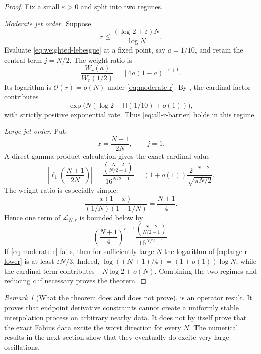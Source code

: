 \documentclass[11pt,oneside]{article}
\theoremstyle{definition}
\theoremstyle{remark}
\newtheorem{remark}[theorem]{Remark}
\newcommand{\bigO}{\mathcal O}
\newcommand{\abs}[1]{\left\lvert #1\right\rvert}
\begin{document}
\begin{proof}
Fix a small $\varepsilon>0$ and split into two regimes.

\emph{Moderate jet order.}  Suppose
\begin{equation}
 r\le \frac{(\log2+\varepsilon)N}{\log N}.
 \label{eq:moderate-r}
\end{equation}
Evaluate \eqref{eq:weighted-lebesgue} at a fixed point, say $a=1/10$, and retain the central term $j=N/2$.  The weight ratio is
\begin{equation}
 \frac{W_r(a)}{W_r(1/2)}=[4a(1-a)]^{r+1}.
\end{equation}
Its logarithm is $\bigO(r)=o(N)$ under \eqref{eq:moderate-r}.  By , the cardinal factor contributes
\[
 \exp\bigl(N(\log2-\mathsf H(1/10)+o(1))\bigr),
\]
with strictly positive exponential rate.  Thus \eqref{eq:all-r-barrier} holds in this regime.

\emph{Large jet order.}  Put
\begin{equation}
 x=\frac{N+1}{2N},\qquad j=1.
\end{equation}
A direct gamma-product calculation gives the exact cardinal value
\begin{equation}
 \abs{\ell_1^{\circ}\!\left(\frac{N+1}{2N}\right)}
 =\frac{\binom{N-2}{N/2-1}}{16^{N/2-1}}
 =(1+o(1))\frac{2^{-N+2}}{\sqrt{\pi N/2}}.
 \label{eq:endpoint-cardinal}
\end{equation}
The weight ratio is especially simple:
\begin{equation}
 \frac{x(1-x)}{(1/N)(1-1/N)}=\frac{N+1}{4}.
 \label{eq:large-r-ratio}
\end{equation}
Hence one term of $\mathscr L_{N,r}$ is bounded below by
\begin{equation}
 \left(\frac{N+1}{4}\right)^{r+1}
 \frac{\binom{N-2}{N/2-1}}{16^{N/2-1}}.
 \label{eq:large-r-lower}
\end{equation}
If \eqref{eq:moderate-r} fails, then for sufficiently large $N$ the logarithm of \eqref{eq:large-r-lower} is at least $\varepsilon N/3$.  Indeed, $\log((N+1)/4)=(1+o(1))\log N$, while the cardinal term contributes $-N\log2+o(N)$.  Combining the two regimes and reducing $c$ if necessary proves the theorem.
\end{proof}

\begin{remark}[What the theorem does and does not prove]
 is an operator result.  It proves that endpoint derivative constraints cannot create a uniformly stable interpolation process on arbitrary nearby data.  It does not by itself prove that the exact Fabius data excite the worst direction for every $N$.  The numerical results in the next section show that they eventually do excite very large oscillations.
\end{remark}
\end{document}
